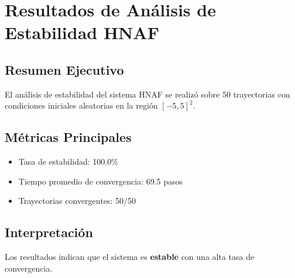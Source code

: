 \section{Resultados de Análisis de Estabilidad HNAF}

\subsection{Resumen Ejecutivo}
El análisis de estabilidad del sistema HNAF se realizó sobre 50 trayectorias con condiciones iniciales aleatorias en la región $[-5, 5]^2$.

\subsection{Métricas Principales}
\begin{itemize}
\item Tasa de estabilidad: 100.0\%
\item Tiempo promedio de convergencia: 69.5 pasos
\item Trayectorias convergentes: 50/50
\end{itemize}

\subsection{Interpretación}
Los resultados indican que el sistema es \textbf{estable} con una alta tasa de convergencia.
